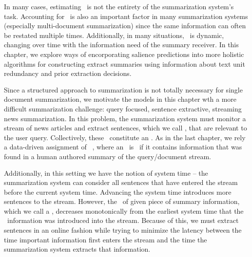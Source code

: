 In many cases, estimating \salience~is not the entirety of the summarization
system's task. Accounting for \redundancy~is also an important factor in
many summarization systems (especially multi-document summarization) 
since the same information can often be restated multiple times. Additionally,
in many situations, \salience~is dynamic, changing
over time with the information need of the summary receiver.
In this chapter, we explore ways of encorporating salience predictions into
more holistic algorithms for constructing extract summaries using information
about text unit redundancy and prior extraction decisions.  







Since a structured approach to summarization is not totally necessary
for single document summarization, we motivate the models in this chapter 
wth a more difficult summarization challenge: 
query focused, sentence extractive, streaming news summarization.
In this problem, the summarization system must monitor a stream of news articles
and extract sentences, which we call \updates, that are relevant to the user 
query. Collectively, these \updates~constitute an \updatesummary. 
As in the last chapter, we rely a data-driven assignment of \update~\salience,
where an \update~is \salient~if it contains information that was found
in a human authored summary of the query/document stream. 

Additionally, in this setting we have the notion of system time -- the 
summarization system can consider all sentences that have entered the 
stream before the current system time. Advancing the system time introduces more
sentences to the stream. However, the \salience~of given piece of summary information, 
which we call a \nugget, decreases monotonically from the earliest 
system time that the \nugget~information was introduced into the stream. 
Because of this, we must extract sentences in an online fashion while trying 
to minimize the latency between the time important information first enters 
the stream and the time the summarization system extracts that information.



